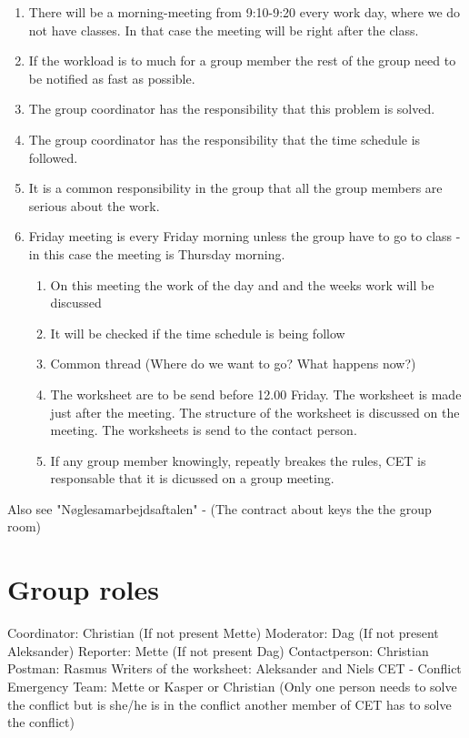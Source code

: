 \begin{enumerate}
\item There will be a morning-meeting from 9:10-9:20 every work day, where we do not have classes. In that case the meeting will be right after the class.
\item If the workload is to much for a group member the rest of the group need to be notified as fast as possible.
\item The group coordinator has the responsibility that this problem is solved. 
\item The group coordinator has the responsibility that the time schedule is followed.
\item It is a common responsibility in the group that all the group members are serious about the work.
\item Friday meeting is every Friday morning unless the group have to go to class - in this case the meeting is Thursday morning. 		\begin{enumerate}
	\item On this meeting the work of the day and and the weeks work will be discussed 
\item It will be checked if the time schedule is being follow 
\item Common thread (Where do we want to go? What happens now?) 
\item The worksheet are to be send before 12.00 Friday. The worksheet is made just after the meeting. The structure of the worksheet is discussed on the meeting. The worksheets is send to the contact person.
\item If any group member knowingly, repeatly breakes the rules, CET is responsable that it is dicussed on a group meeting.  
\end{enumerate}
\end{enumerate}

Also see "Nøglesamarbejdsaftalen" - (The contract about keys the the group room)

\section*{Group roles}

Coordinator: Christian (If not present Mette)
\newline
\newline
Moderator: Dag (If not present Aleksander)
\newline
\newline
Reporter: Mette (If not present Dag)
\newline
\newline
Contactperson: Christian
\newline
\newline
Postman: Rasmus
\newline
\newline
Writers of the worksheet: Aleksander and Niels
\newline
\newline
CET - Conflict Emergency Team: Mette or Kasper or Christian (Only one person needs to solve the conflict but is she/he is in the conflict another member of CET has to solve the conflict)